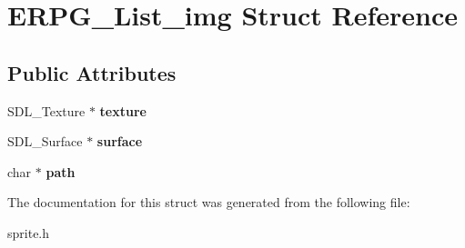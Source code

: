 \hypertarget{structERPG__List__img}{\section{E\-R\-P\-G\-\_\-\-List\-\_\-img Struct Reference}
\label{structERPG__List__img}
}
\subsection*{Public Attributes}
\begin{DoxyCompactItemize}
\item 
\hypertarget{structERPG__List__img_a144d84a55388a7054a644911417c4a2d}{S\-D\-L\-\_\-\-Texture $\ast$ {\bfseries texture}}\label{structERPG__List__img_a144d84a55388a7054a644911417c4a2d}

\item 
\hypertarget{structERPG__List__img_a2785c8a4cfe810b6ca1b5054f3d46abe}{S\-D\-L\-\_\-\-Surface $\ast$ {\bfseries surface}}\label{structERPG__List__img_a2785c8a4cfe810b6ca1b5054f3d46abe}

\item 
\hypertarget{structERPG__List__img_acaab7fbc5654556f7121ecc235e2460c}{char $\ast$ {\bfseries path}}\label{structERPG__List__img_acaab7fbc5654556f7121ecc235e2460c}

\end{DoxyCompactItemize}


The documentation for this struct was generated from the following file\-:\begin{DoxyCompactItemize}
\item 
sprite.\-h\end{DoxyCompactItemize}
